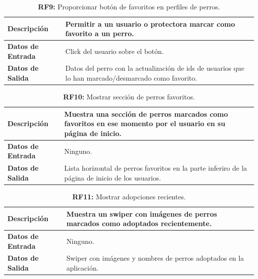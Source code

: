 \documentclass[a4paper, 12pt]{article}
\begin{document}
\begin{table}[H]
\captionsetup{justification=raggedright,singlelinecheck=false}
\caption{\textbf{RF9:} Proporcionar botón de favoritos en perfiles de perros.}
\label{tab:RF9}
	\begin{tabular}{|m{5cm}|m{10cm}|}
	\hline
	\textbf{Descripción} & Permitir a un usuario o protectora marcar como favorito a un perro. \\ 
	\hline
	\textbf{Datos de Entrada} & Click del usuario sobre el botón. \\ 
	\hline
	\textbf{Datos de Salida} & Datos del perro con la actualización de ids de usuarios que lo han marcado/desmarcado como favorito.\\ 
	\hline
\end{tabular}
\end{table}

\begin{table}[H]
\captionsetup{justification=raggedright,singlelinecheck=false}
\caption{\textbf{RF10:} Mostrar sección de perros favoritos. }
\label{tab:RF10}
	\begin{tabular}{|m{5cm}|m{10cm}|}
	\hline
	\textbf{Descripción} & Muestra una sección de perros marcados como favoritos en ese momento por el usuario en su página de inicio. \\ 
	\hline
	\textbf{Datos de Entrada} & Ninguno. \\ 
	\hline
	\textbf{Datos de Salida} & Lista horizontal de perros favoritos en la parte inferiro de la página de inicio de los usuarios. \\ 
	\hline
\end{tabular}
\end{table}

\begin{table}[H]
\captionsetup{justification=raggedright,singlelinecheck=false}
\caption{\textbf{RF11:} Mostrar adopciones recientes.}
\label{tab:RF11}
	\begin{tabular}{|m{5cm}|m{10cm}|}
	\hline
	\textbf{Descripción} & Muestra un swiper con imágenes de perros marcados como adoptados recientemente. \\ 
	\hline
	\textbf{Datos de Entrada} & Ninguno. \\ 
	\hline
	\textbf{Datos de Salida} & Swiper con imágenes y nombres de perros adoptados en la aplicación. \\ 
	\hline
\end{tabular}
\end{table}
\end{document}
